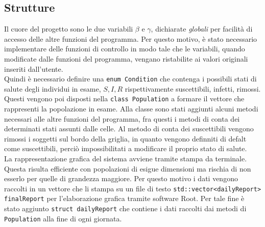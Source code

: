 \documentclass[a4paper]{article}
\begin{document}
\subsection{Strutture}
Il cuore del progetto sono le due variabili $\beta$ e $\gamma$, dichiarate \textit{globali} per facilità di accesso delle altre funzioni del programma. Per questo motivo, è stato necessario implementare delle funzioni di controllo in modo tale che le variabili, quando modificate dalle funzioni  del programma, vengano ristabilite ai valori originali inseriti dall'utente.\\
Quindi è necessario definire una \texttt{enum Condition} che contenga i possibili stati di salute degli individui in esame, $S, I, R$ rispettivamente suscettibili, infetti, rimossi.\\
Questi vengono poi disposti nella \texttt{class Population} a formare il vettore che rappresenti la popolazione in esame. Alla classe sono stati aggiunti alcuni metodi necessari alle altre funzioni del programma, fra questi i metodi di conta dei determinati stati assunti dalle celle. Al metodo di conta dei suscettibili vengono rimossi i soggetti sul bordo della griglia, in quanto vengono definniti di defalt come suscettibili, perciò impossibilitati a modificare il proprio stato di salute.\\
La rappresentazione grafica del sistema avviene tramite stampa da terminale. Questa risulta efficiente con popolazioni di esigue dimensioni ma rischia di non esserlo per quelle di grandezza maggiore. Per questo motivo i dati vengono raccolti in un vettore che li stampa su un file di testo \texttt{std::vector<dailyReport> finalReport} per l'elaborazione grafica tramite software Root. Per tale fine è stato aggiunto \texttt{struct dailyReport} che contiene i dati raccolti dai metodi di \texttt{Population} alla fine di ogni giornata.\\
\end{document}
